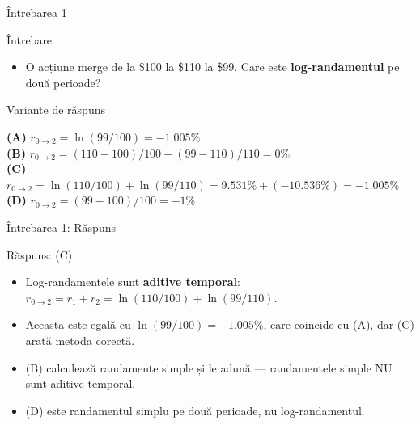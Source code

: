 \documentclass[9pt, aspectratio=169, t]{beamer}
\theoremstyle{definition}
\newenvironment{cminipage}[1]{%
    \par\noindent\hfill\begin{minipage}{#1}\ignorespaces
}{%
    \end{minipage}\hfill\null\par
}
\begin{document}
\begin{frame}{Întrebarea 1}
    \begin{cminipage}{0.95\textwidth}
    \begin{alertblock}{Întrebare}
        \begin{itemize}
            \item O acțiune merge de la \$100 la \$110 la \$99. Care este \textbf{log-randamentul} pe două perioade?
        \end{itemize}
    \end{alertblock}

    \vspace{0.3cm}

    \begin{block}{Variante de răspuns}

        \textcolor{MainBlue}{\textbf{(A)}} $r_{0\to2} = \ln(99/100) = -1.005\%$\\[3pt]

        \textcolor{MainBlue}{\textbf{(B)}} $r_{0\to2} = (110-100)/100 + (99-110)/110 = 0\%$\\[3pt]

        \textcolor{MainBlue}{\textbf{(C)}} $r_{0\to2} = \ln(110/100) + \ln(99/110) = 9.531\% + (-10.536\%) = -1.005\%$\\[3pt]

        \textcolor{MainBlue}{\textbf{(D)}} $r_{0\to2} = (99-100)/100 = -1\%$

    \end{block}
    \end{cminipage}
\end{frame}

\begin{frame}{Întrebarea 1: Răspuns}
    \begin{cminipage}{0.95\textwidth}
    \begin{exampleblock}{Răspuns: (C)}
    \begin{itemize}
        \item Log-randamentele sunt \textbf{aditive temporal}: $r_{0\to2} = r_1 + r_2 = \ln(110/100) + \ln(99/110)$.
        \item Aceasta este egală cu $\ln(99/100) = -1.005\%$, care coincide cu (A), dar (C) arată metoda corectă.
        \item (B) calculează randamente simple și le adună --- randamentele simple NU sunt aditive temporal.
        \item (D) este randamentul simplu pe două perioade, nu log-randamentul.
    \end{itemize}
    \end{exampleblock}
    \end{cminipage}
\end{frame}
\end{document}

